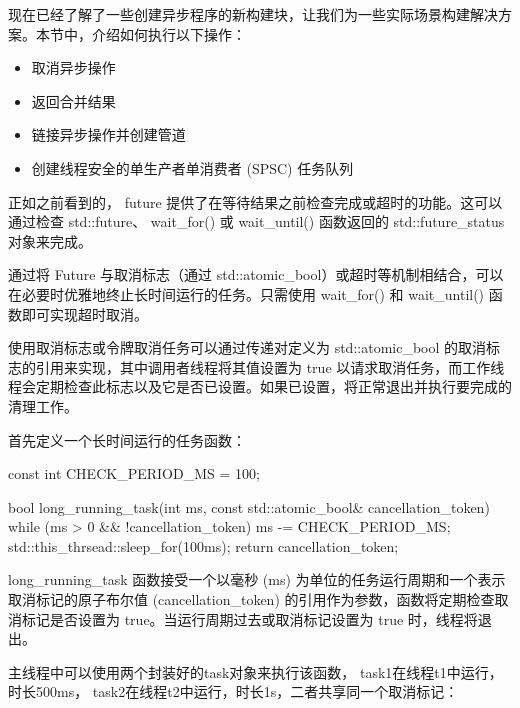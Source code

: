 
现在已经了解了一些创建异步程序的新构建块，让我们为一些实际场景构建解决方案。本节中，介绍如何执行以下操作：

\begin{itemize}
\item
取消异步操作

\item
返回合并结果

\item
链接异步操作并创建管道

\item
创建线程安全的单生产者单消费者 (SPSC) 任务队列
\end{itemize}


正如之前看到的， future 提供了在等待结果之前检查完成或超时的功能。这可以通过检查 std::future、 wait\_for() 或 wait\_until() 函数返回的 std::future\_status 对象来完成。

通过将 Future 与取消标志（通过 std::atomic\_bool）或超时等机制相结合，可以在必要时优雅地终止长时间运行的任务。只需使用 wait\_for() 和 wait\_until() 函数即可实现超时取消。

使用取消标志或令牌取消任务可以通过传递对定义为 std::atomic\_bool 的取消标志的引用来实现，其中调用者线程将其值设置为 true 以请求取消任务，而工作线程会定期检查此标志以及它是否已设置。如果已设置，将正常退出并执行要完成的清理工作。

首先定义一个长时间运行的任务函数：

\begin{cpp}
const int CHECK_PERIOD_MS = 100;

bool long_running_task(int ms,
            const std::atomic_bool& cancellation_token) {
    while (ms > 0 && !cancellation_token) {
        ms -= CHECK_PERIOD_MS;
        std::this_thrsead::sleep_for(100ms);
    }
    return cancellation_token;
}
\end{cpp}

long\_running\_task 函数接受一个以毫秒 (ms) 为单位的任务运行周期和一个表示取消标记的原子布尔值 (cancellation\_token) 的引用作为参数，函数将定期检查取消标记是否设置为 true。当运行周期过去或取消标记设置为 true 时，线程将退出。

主线程中可以使用两个封装好的task对象来执行该函数， task1在线程t1中运行，时长500ms， task2在线程t2中运行，时长1s，二者共享同一个取消标记：

